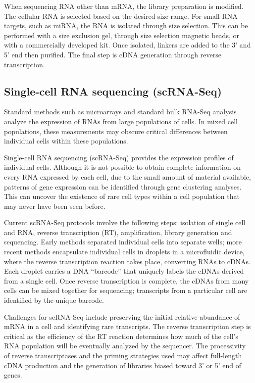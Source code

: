 When sequencing RNA other than mRNA, the library preparation is modified. The cellular RNA is selected based on the desired size range. For small RNA targets, such as miRNA, the RNA is isolated through size selection. This can be performed with a size exclusion gel, through size selection magnetic beads, or with a commercially developed kit. Once isolated, linkers are added to the 3' and 5' end then purified. The final step is cDNA generation through reverse transcription.

\hypertarget{single-cell-rna-sequencing-scrna-seq}{%
\subsection{Single-cell RNA sequencing (scRNA-Seq)}\label{single-cell-rna-sequencing-scrna-seq}}

Standard methods such as microarrays and standard bulk RNA-Seq analysis analyze the expression of RNAs from large populations of cells. In mixed cell populations, these measurements may obscure critical differences between individual cells within these populations.

Single-cell RNA sequencing (scRNA-Seq) provides the expression profiles of individual cells. Although it is not possible to obtain complete information on every RNA expressed by each cell, due to the small amount of material available, patterns of gene expression can be identified through gene clustering analyses. This can uncover the existence of rare cell types within a cell population that may never have been seen before.

Current scRNA-Seq protocols involve the following steps: isolation of single cell and RNA, reverse transcription (RT), amplification, library generation and sequencing. Early methods separated individual cells into separate wells; more recent methods encapsulate individual cells in droplets in a microfluidic device, where the reverse transcription reaction takes place, converting RNAs to cDNAs. Each droplet carries a DNA ``barcode'' that uniquely labels the cDNAs derived from a single cell. Once reverse transcription is complete, the cDNAs from many cells can be mixed together for sequencing; transcripts from a particular cell are identified by the unique barcode.

Challenges for scRNA-Seq include preserving the initial relative abundance of mRNA in a cell and identifying rare transcripts. The reverse transcription step is critical as the efficiency of the RT reaction determines how much of the cell's RNA population will be eventually analyzed by the sequencer. The processivity of reverse transcriptases and the priming strategies used may affect full-length cDNA production and the generation of libraries biased toward 3' or 5' end of genes.

